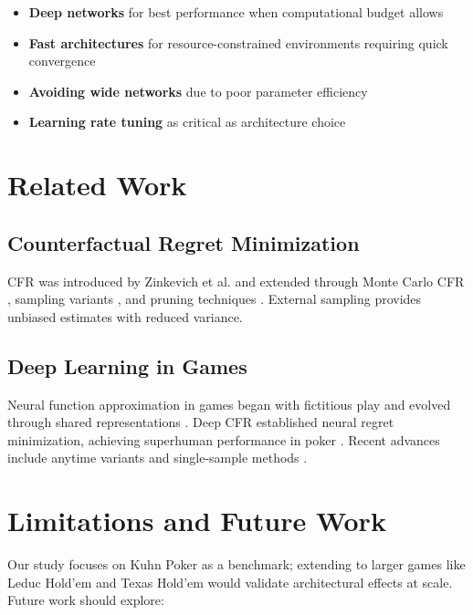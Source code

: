 \documentclass{article}
\begin{document}
\begin{itemize}
\item \textbf{Deep networks} for best performance when computational budget allows
\item \textbf{Fast architectures} for resource-constrained environments requiring quick convergence
\item \textbf{Avoiding wide networks} due to poor parameter efficiency
\item \textbf{Learning rate tuning} as critical as architecture choice
\end{itemize}

\section{Related Work}

\subsection{Counterfactual Regret Minimization}

CFR was introduced by Zinkevich et al. \cite{zinkevich2007regret} and extended through Monte Carlo CFR \cite{lanctot2009monte}, sampling variants \cite{gibson2012efficient}, and pruning techniques \cite{lanctot2013efficient}. External sampling \cite{gibson2012efficient} provides unbiased estimates with reduced variance.

\subsection{Deep Learning in Games}

Neural function approximation in games began with fictitious play \cite{heinrich2015fictitious} and evolved through shared representations \cite{muller2019shared}. Deep CFR \cite{heinrich2016deep,brown2019deep} established neural regret minimization, achieving superhuman performance in poker \cite{brown2019superhuman}. Recent advances include anytime variants \cite{mcaleer2022anytime} and single-sample methods \cite{steinberger2019single}.

\section{Limitations and Future Work}

Our study focuses on Kuhn Poker as a benchmark; extending to larger games like Leduc Hold'em and Texas Hold'em would validate architectural effects at scale. Future work should explore:
\end{document}

